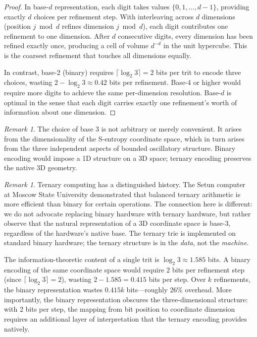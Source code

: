 \documentclass[11pt,twocolumn,a4paper]{article}
\theoremstyle{definition}
\theoremstyle{remark}
\newtheorem{remark}[theorem]{Remark}
\begin{document}
\begin{proof}
In base-$d$ representation, each digit takes values $\{0, 1, \ldots, d-1\}$, providing exactly $d$ choices per refinement step. With interleaving across $d$ dimensions (position $j \bmod d$ refines dimension $j \bmod d$), each digit contributes one refinement to one dimension. After $d$ consecutive digits, every dimension has been refined exactly once, producing a cell of volume $d^{-d}$ in the unit hypercube. This is the coarsest refinement that touches all dimensions equally.

In contrast, base-2 (binary) requires $\lceil \log_2 3 \rceil = 2$ bits per trit to encode three choices, wasting $2 - \log_2 3 \approx 0.42$ bits per refinement. Base-4 or higher would require more digits to achieve the same per-dimension resolution. Base-$d$ is optimal in the sense that each digit carries exactly one refinement's worth of information about one dimension.
\end{proof}

\begin{remark}
The choice of base 3 is not arbitrary or merely convenient. It arises from the dimensionality of the S-entropy coordinate space, which in turn arises from the three independent aspects of bounded oscillatory structure. Binary encoding would impose a 1D structure on a 3D space; ternary encoding preserves the native 3D geometry.
\end{remark}

\begin{remark}
Ternary computing has a distinguished history. The Setun computer at Moscow State University \citep{brusentsov1962} demonstrated that balanced ternary arithmetic is more efficient than binary for certain operations. The connection here is different: we do not advocate replacing binary hardware with ternary hardware, but rather observe that the natural representation of a 3D coordinate space is base-3, regardless of the hardware's native base. The ternary trie is implemented on standard binary hardware; the ternary structure is in the \emph{data}, not the \emph{machine}.
\end{remark}

The information-theoretic content of a single trit is $\log_2 3 \approx 1.585$ bits. A binary encoding of the same coordinate space would require 2 bits per refinement step (since $\lceil \log_2 3 \rceil = 2$), wasting $2 - 1.585 = 0.415$ bits per step. Over $k$ refinements, the binary representation wastes $0.415k$ bits---roughly 26\% overhead. More importantly, the binary representation obscures the three-dimensional structure: with 2 bits per step, the mapping from bit position to coordinate dimension requires an additional layer of interpretation that the ternary encoding provides natively.
\end{document}
